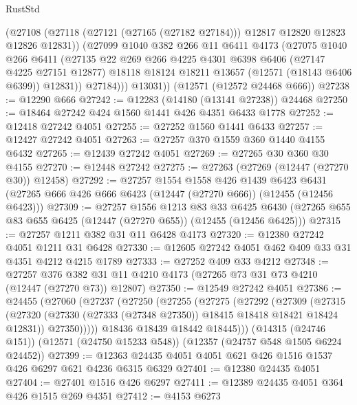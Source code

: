 \begin{lexlean}{RustStd}
\begin{coremodule}
            (@27108 (@27118 (@27121 (@27165 (@27182 @27184))) @12817 @12820 @12823 @12826 @12831))
            (@27099
              @1040
              @382
              @266
              @11
              @6411
              @4173
              (@27075
                @1040
                @266
                @6411
                (@27135
                  @22
                  @269
                  @266
                  @4225
                  @4301
                  @6398
                  @6406
                  (@27147 @4225 @27151 @12877)
                  @18118
                  @18124
                  @18211
                  @13657
                  (@12571 (@18143 @6406 @6399))
                  @12831))
              @27184)))
        @13031))
    (@12571 (@12572 @24468 @666))
@27238 := @12290 @666
@27242 := @12283 (@14180 (@13141 @27238)) @24468
@27250 := @18464 @27242 @424 @1560 @1441 @426 @4351 @6433 @1778
@27252 := @12418 @27242 @4051
@27255 := @27252 @1560 @1441 @6433
@27257 := @12427 @27242 @4051
@27263 := @27257 @370 @1559 @360 @1440 @4155 @6432
@27265 := @12439 @27242 @4051
@27269 := @27265 @30 @360 @30 @4155
@27270 := @12448 @27242
@27275 := @27263 (@27269 (@12447 (@27270 @30)) @12458)
@27292 := @27257
    @1554
    @1558
    @426
    @1439
    @6423
    @6431
    (@27265 @666 @426 @666 @6423 (@12447 (@27270 @666)) (@12455 (@12456 @6423)))
@27309 := @27257
    @1556
    @1213
    @83
    @33
    @6425
    @6430
    (@27265 @655 @83 @655 @6425 (@12447 (@27270 @655)) (@12455 (@12456 @6425)))
@27315 := @27257 @1211 @382 @31 @11 @6428 @4173
@27320 := @12380 @27242 @4051 @1211 @31 @6428
@27330 := @12605 @27242 @4051 @462 @409 @33 @31 @4351 @4212 @4215 @1789
@27333 := @27252 @409 @33 @4212
@27348 := @27257
    @376
    @382
    @31
    @11
    @4210
    @4173
    (@27265 @73 @31 @73 @4210 (@12447 (@27270 @73)) @12807)
@27350 := @12549 @27242 @4051
@27386 := @24455
    (@27060
      (@27237
        (@27250
          (@27255
            (@27275
              (@27292
                (@27309
                  (@27315
                    (@27320 (@27330 (@27333 (@27348 @27350)) @18415 @18418 @18421 @18424 @12831))
                    @27350)))))
          @18436
          @18439
          @18442
          @18445)))
    (@14315 (@24746 @151))
    (@12571 (@24750 @15233 @548))
    (@12357 (@24757 @548 @1505 @6224 @24452))
@27399 := @12363 @24435 @4051 @4051 @621 @426 @1516 @1537 @426 @6297 @621 @4236 @6315 @6329
@27401 := @12380 @24435 @4051
@27404 := @27401 @1516 @426 @6297
@27411 := @12389 @24435 @4051 @364 @426 @1515 @269 @4351
@27412 := @4153 @6273

\end{coremodule}
\end{lexlean}
